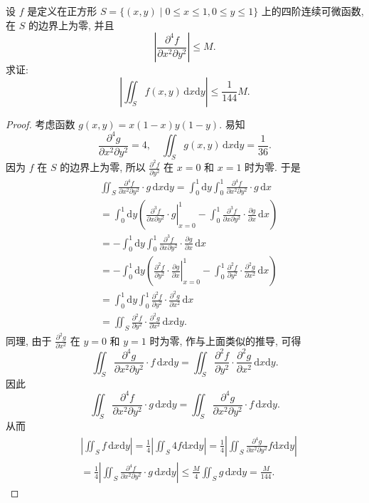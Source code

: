 \documentclass[../../main.tex]{subfiles}%
\begin{document}
\begin{example}
设 \( f \) 是定义在正方形 \( S = \{ (x,y) \mid 0 \leqslant x \leqslant 1, 0 \leqslant y \leqslant 1 \} \) 上的四阶连续可微函数, 在 \( S \) 的边界上为零, 并且
\[
\left| \frac{\partial^4 f}{\partial x^2 \partial y^2} \right| \leqslant M.
\]
求证: 
\[
\left| \iint_S f(x,y) \, \mathrm{d}x\mathrm{d}y \right| \leqslant \frac{1}{144} M.
\]
\end{example}
\begin{proof}
考虑函数 \( g(x,y) = x(1 - x)y(1 - y) \). 易知
\[
\frac{\partial^4 g}{\partial x^2 \partial y^2} = 4, \quad \iint_S g(x,y) \, \mathrm{d}x\mathrm{d}y = \frac{1}{36}.
\]
因为 \( f \) 在 \( S \) 的边界上为零, 所以 \( \frac{\partial^2 f}{\partial y^2} \) 在 \( x = 0 \) 和 \( x = 1 \) 时为零. 于是
\begin{align*}
&\iint_S{\frac{\partial ^4f}{\partial x^2\partial y^2}}\cdot g\,\mathrm{d}x\mathrm{d}y=\int_0^1{\mathrm{d}y\int_0^1{\frac{\partial ^4f}{\partial x^2\partial y^2}}}\cdot g\,\mathrm{d}x
\\
&=\int_0^1{\mathrm{d}y\left( \left. \frac{\partial ^3f}{\partial x\partial y^2}\cdot g \right|_{x=0}^{1}-\int_0^1{\frac{\partial ^3f}{\partial x\partial y^2}}\cdot \frac{\partial g}{\partial x}\,\mathrm{d}x \right)}
\\
&=-\int_0^1{\mathrm{d}y\int_0^1{\frac{\partial ^3f}{\partial x\partial y^2}}}\cdot \frac{\partial g}{\partial x}\,\mathrm{d}x
\\
&=-\int_0^1{\mathrm{d}y\left( \left. \frac{\partial ^2f}{\partial y^2}\cdot \frac{\partial g}{\partial x} \right|_{x=0}^{1}-\int_0^1{\frac{\partial ^2f}{\partial y^2}}\cdot \frac{\partial ^2g}{\partial x^2}\,\mathrm{d}x \right)}
\\
&=\int_0^1{\mathrm{d}y\int_0^1{\frac{\partial ^2f}{\partial y^2}}}\cdot \frac{\partial ^2g}{\partial x^2}\,\mathrm{d}x
\\
&=\iint_S{\frac{\partial ^2f}{\partial y^2}}\cdot \frac{\partial ^2g}{\partial x^2}\,\mathrm{d}x\mathrm{d}y.
\end{align*}
同理, 由于 \( \frac{\partial^2 g}{\partial x^2} \) 在 \( y = 0 \) 和 \( y = 1 \) 时为零, 作与上面类似的推导, 可得
\[
\iint_S \frac{\partial^4 g}{\partial x^2 \partial y^2} \cdot f \, \mathrm{d}x\mathrm{d}y = \iint_S \frac{\partial^2 f}{\partial y^2} \cdot \frac{\partial^2 g}{\partial x^2} \, \mathrm{d}x\mathrm{d}y.
\]
因此
\[
\iint_S \frac{\partial^4 f}{\partial x^2 \partial y^2} \cdot g \, \mathrm{d}x\mathrm{d}y = \iint_S \frac{\partial^4 g}{\partial x^2 \partial y^2} \cdot f \, \mathrm{d}x\mathrm{d}y.
\]
从而
\begin{align*}
&\left| \iint_S{f\,\mathrm{d}x\mathrm{d}y} \right|=\frac{1}{4}\left| \iint_S{4f\mathrm{d}x\mathrm{d}y} \right|=\frac{1}{4}\left| \iint_S{\frac{\partial ^4g}{\partial x^2\partial y^2}f\mathrm{d}x\mathrm{d}y} \right|
\\
&=\frac{1}{4}\left| \iint_S{\frac{\partial ^4f}{\partial x^2\partial y^2}\cdot g\,\mathrm{d}x\mathrm{d}y} \right|\leqslant \frac{M}{4}\iint_S{g\,\mathrm{d}x\mathrm{d}y}=\frac{M}{144}.
\end{align*}
\end{proof}
\end{document}
